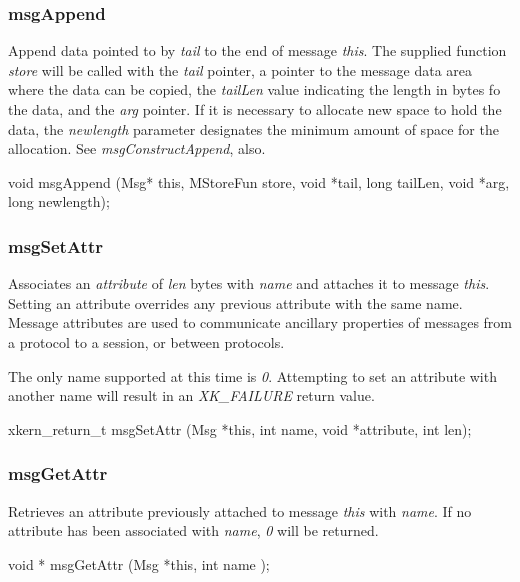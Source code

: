 \subsubsection{msgAppend}

Append data pointed to by {\em tail} to the end of message {\em
this}.  The supplied function {\em store} will be called with the {\em
tail} pointer, a pointer to the message data area where the data
can be copied, the {\em tailLen} value indicating the length in bytes
fo the data, and the {\em arg} pointer.
If it is necessary to allocate new space to hold the data, the
{\em newlength} parameter designates the minimum amount of space 
for the allocation.  See {\em msgConstructAppend}, also.
\medskip

{\sem void} {\bold msgAppend} ({\sem Msg*} {\caps this}, {\sem
MStoreFun} {\caps  store}, {\sem void} *{\caps tail}, {\sem long}
{\caps tailLen}, {\sem void} *{\caps arg}, {\sem long} {\caps newlength});
\medskip

\subsubsection{msgSetAttr}

Associates an {\em attribute} of {\em len} bytes with {\em name}
and attaches it to message {\em this}.  Setting an attribute overrides
any previous attribute with the same name.  Message attributes are used
to communicate ancillary properties of messages from a protocol to a session,
or between protocols.

The only name supported at this time is {\em 0}.  Attempting to set an
attribute with another name will result in an {\em XK\_FAILURE} return
value.  

\medskip

{\sem xkern\_return\_t} {\bold msgSetAttr} 
({\sem Msg} *{\caps this}, {\sem int} {\caps name},
{\sem void} *{\caps attribute}, {\sem int} {\caps len});
\medskip

\subsubsection{msgGetAttr}

Retrieves an attribute previously attached to message {\em this} with
{\em name}.  If no attribute has been associated with {\em name}, 
{\em 0} will be returned.
\medskip

{\sem void *} {\bold msgGetAttr} 
({\sem Msg} *{\caps this}, {\sem int} {\caps name} );

